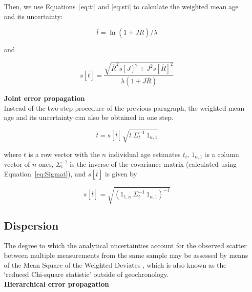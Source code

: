 \documentclass{article}
\begin{document}
Then, we use Equations~\ref{eq:ti} and \ref{eq:sti} to calculate the
weighted mean age and its uncertainty:

\begin{equation}
  \overline{t} = \ln\left(1 + J \overline{R}\right)/\lambda
  \label{eq:bart}
\end{equation}

\noindent and

\begin{equation}
  s[\overline{t}] =
  \frac{\sqrt{\overline{R}^2 s[J]^2 + J^2 s[\overline{R}]^2}}{\lambda (1 + J \overline{R})}
  \label{eq:sbart}
\end{equation}

\noindent\textbf{Joint error propagation}\\

Instead of the two-step procedure of the previous paragraph, the
weighted mean age and its uncertainty can also be obtained in one
step.

\begin{equation}
  \overline{t} = s[\overline{t}] \sqrt{t ~ \Sigma_t^{-1} ~ 1_{n,1}}
  \label{eq:bart2}
\end{equation}

\noindent where $t$ is a row vector with the $n$ individual age
estimates $t_i$, $1_{n,1}$ is a column vector of $n$ ones,
$\Sigma_t^{-1}$ is the inverse of the covariance matrix (calculated
using Equation~\ref{eq:Sigmat}), and $s[\overline{t}]$ is given by

\begin{equation}
  s[\overline{t}] =
  \sqrt{ \left( 1_{1,n} ~ \Sigma_{t}^{-1} ~ 1_{n,1} \right)^{-1} }
  \label{eq:sbart2}
\end{equation}

\subsection{Dispersion}
\label{sec:dispersion}

The degree to which the analytical uncertainties account for the
observed scatter between multiple measurements from the same sample
may be assessed by means of the Mean Square of the Weighted Deviates
\citep[$MSWD$,][]{mcintyre1966}, which is also known as the `reduced
Chi-square statistic' outside of geochronology.\\

\noindent\textbf{Hierarchical error propagation}\\
\end{document}
